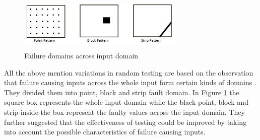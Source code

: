 \documentclass{acm_proc_article-sp}
\begin{document}
\begin{figure}[h]
\centering
\includegraphics[width=8cm,height=2.5cm]{ART_Patterns.png}
\caption{Failure domains across input domain \cite{Chan1996}}
\label{fig:patterns}
\end{figure}


All the above mention variations in random testing are based on the observation that failure causing inputs across the whole input form certain kinds of domains \cite{Chan1996}.  They divided them into point, block and strip fault domain. In Figure \ref{fig:patterns} the square box represents the whole input domain while the black point, block and strip inside the box represent the faulty values across the input domain. They further suggested that the effectiveness of testing could be improved by taking into account the possible characteristics of failure causing inputs.





\end{document}

